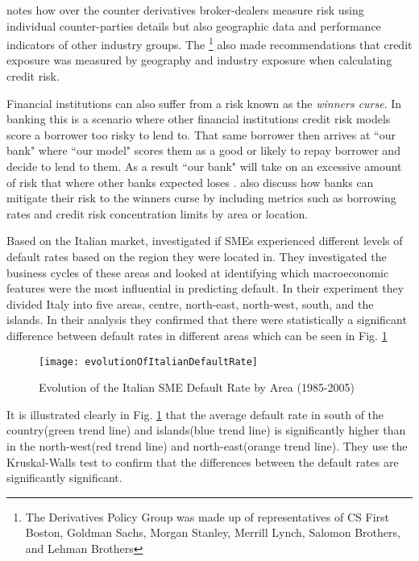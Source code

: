 \cite{fama_term_1986} notes how over the counter derivatives broker-dealers measure risk using individual counter-parties details but also geographic data and performance indicators of other industry groups. The \cite{derivatives_policy_group_framework_1995} \footnote{The Derivatives Policy Group was made up of representatives of CS First Boston, Goldman Sachs, Morgan Stanley, Merrill Lynch, Salomon Brothers, and Lehman Brothers} also made recommendations that credit exposure was measured by geography and industry exposure when calculating credit risk.

Financial institutions can also suffer from a risk known as the \textit{winners curse}. In banking this is a scenario where other financial institutions credit risk models score a borrower too risky to lend to. That same borrower then arrives at ``our bank" where ``our model" scores them as a good or likely to repay borrower and decide to lend to them. As a result ``our bank" will take on an excessive amount of risk that where other banks expected loses \citep{duffie_credit_2012}. \cite{duffie_credit_2012} also discuss how banks can mitigate their risk to the winners curse by including metrics such as borrowing rates and credit risk concentration limits by area or location.

Based on the Italian market, \citep{di_pietro_regional} investigated if SMEs experienced different levels of default rates based on the region they were located in. They investigated the business cycles of these areas and looked at identifying which macroeconomic features were the most influential in predicting default. In their experiment they divided Italy into five areas, centre, north-east, north-west, south, and the islands. In their analysis they confirmed that there were statistically a significant difference between default rates in different areas which can be seen in Fig. \ref{fig:evolutionOfItalianDefaultRate}

\begin{figure}[H]
	\texttt{[image: evolutionOfItalianDefaultRate]}
	\caption{Evolution of the Italian SME Default Rate by Area (1985-2005) \\
	\cite[Source:][]{di_pietro_regional}		
			}
	\label{fig:evolutionOfItalianDefaultRate}
\end{figure}

It is  illustrated clearly in Fig. \ref{fig:evolutionOfItalianDefaultRate} that the average default rate in south of the country(green trend line) and islands(blue trend line) is significantly higher than in the north-west(red trend line) and north-east(orange trend line). They use the Kruskal-Walls test to confirm that the differences between the default rates are significantly significant.

